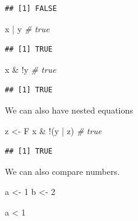\documentclass[
]{book}
\newenvironment{Shaded}{\begin{snugshade}}{\end{snugshade}}
\newcommand{\CommentTok}[1]{\textcolor[rgb]{0.56,0.35,0.01}{\textit{#1}}}
\newcommand{\DecValTok}[1]{\textcolor[rgb]{0.00,0.00,0.81}{#1}}
\newcommand{\NormalTok}[1]{#1}
\newcommand{\OtherTok}[1]{\textcolor[rgb]{0.56,0.35,0.01}{#1}}
\newcommand{\SpecialCharTok}[1]{\textcolor[rgb]{0.00,0.00,0.00}{#1}}
\begin{document}
\begin{verbatim}
## [1] FALSE
\end{verbatim}

\begin{Shaded}
\begin{Highlighting}[]
\NormalTok{x }\SpecialCharTok{|}\NormalTok{ y }\CommentTok{\# true}
\end{Highlighting}
\end{Shaded}

\begin{verbatim}
## [1] TRUE
\end{verbatim}

\begin{Shaded}
\begin{Highlighting}[]
\NormalTok{x }\SpecialCharTok{\&} \SpecialCharTok{!}\NormalTok{y }\CommentTok{\# true}
\end{Highlighting}
\end{Shaded}

\begin{verbatim}
## [1] TRUE
\end{verbatim}

We can also have nested equations

\begin{Shaded}
\begin{Highlighting}[]
\NormalTok{z }\OtherTok{\textless{}{-}}\NormalTok{ F}
\NormalTok{x }\SpecialCharTok{\&} \SpecialCharTok{!}\NormalTok{(y }\SpecialCharTok{|}\NormalTok{ z) }\CommentTok{\# true}
\end{Highlighting}
\end{Shaded}

\begin{verbatim}
## [1] TRUE
\end{verbatim}

We can also compare numbers.

\begin{Shaded}
\begin{Highlighting}[]
\NormalTok{a }\OtherTok{\textless{}{-}} \DecValTok{1}
\NormalTok{b }\OtherTok{\textless{}{-}} \DecValTok{2}
\end{Highlighting}
\end{Shaded}

\begin{Shaded}
\begin{Highlighting}[]
\NormalTok{a }\SpecialCharTok{\textless{}} \DecValTok{1}
\end{Highlighting}
\end{Shaded}
\end{document}
